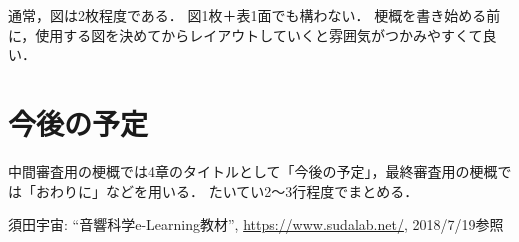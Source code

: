 \documentclass[twocolumn,10pt,a4j]{jsarticle}
\begin{document}
通常，図は2枚程度である．
図1枚＋表1面でも構わない．
梗概を書き始める前に，使用する図を決めてからレイアウトしていくと雰囲気がつかみやすくて良い．




\section{今後の予定}
中間審査用の梗概では4章のタイトルとして「今後の予定」，最終審査用の梗概では「おわりに」などを用いる．
たいてい2〜3行程度でまとめる．

\begin{thebibliography}{99}
 須田宇宙: ``音響科学e-Learning教材'', \url{https://www.sudalab.net/}, 2018/7/19参照
\end{thebibliography}
\end{document}
